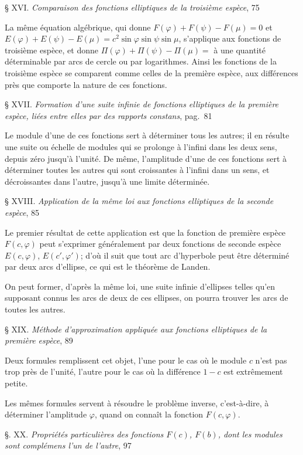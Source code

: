 \documentclass{article}
\begin{document}
§ XVI. \emph{Comparaison des fonctions elliptiques de la troisième espèce}, 75

La même équation algébrique, qui donne $F(\varphi)+F(\psi)-F(\mu)=0$ et $E(\varphi)+E(\psi)-E(\mu)=c^{2}\sin\varphi\sin\psi\sin\mu$, s'applique aux fonctions de troisième espèce, et donne $\Pi(\varphi)+\Pi(\psi)-\Pi(\mu)=$ à une quantité déterminable par arcs de cercle ou par logarithmes. Ainsi les fonctions de la troisième espèce se comparent comme celles de la première espèce, aux différences près que comporte la nature de ces fonctions.


§ XVII. \emph{Formation d'une suite infinie de fonctions elliptiques de la première espèce, liées entre elles par des rapports constans}, pag.~81

Le module d'une de ces fonctions sert à déterminer tous les autres; il en résulte une suite ou échelle de modules qui se prolonge à l'infini dans les deux sens, depuis zéro jusqu'à l'unité. De même, l'amplitude d'une de ces fonctions sert à déterminer toutes les autres qui sont croissantes à l'infini dans un sens, et décroissantes dans l'autre, jusqu'à une limite déterminée.

§ XVIII. \emph{Application de la même loi aux fonctions elliptiques de la seconde espèce}, 85

Le premier résultat de cette application est que la fonction de première espèce $F(c,\varphi)$ peut s'exprimer généralement par deux fonctions de seconde espèce $E(c,\varphi)$, $E(c',\varphi')$; d'où il suit que tout arc d'hyperbole peut être déterminé par deux arcs d'ellipse, ce qui est le théorème de Landen.

On peut former, d'après la même loi, une suite infinie d'ellipses telles qu'en supposant connus les arcs de deux de ces ellipses, on pourra trouver les arcs de toutes les autres.

§ XIX. \emph{Méthode d'approximation appliquée aux fonctions elliptiques de la première espèce}, 89

Deux formules remplissent cet objet, l'une pour le cas où le module $c$ n'est pas trop près de l'unité, l'autre pour le cas où la différence $1-c$ est extrêmement petite.

Les mêmes formules servent à résoudre le problème inverse, c'est-à-dire, à déterminer l'amplitude $\varphi$, quand on connaît la fonction $F(c,\varphi)$.

§. XX. \emph{Propriétés particulières des fonctions $F(c)$, $F(b)$, dont les modules sont complémens l'un de l'autre}, 97
\end{document}
